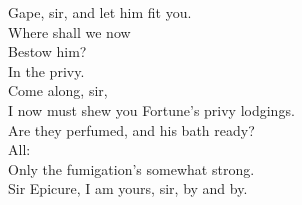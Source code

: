 \documentclass{memoir}
\begin{document}
\begin{drama*}
 Gape, sir, and let him fit you.\\
\subtlespeaks {} Where shall we now\\
 Bestow him?\\
\dolspeaks {} In the privy.\\
\subtlespeaks {} Come along, sir,\\
 I now must shew you Fortune's privy lodgings.\\
\facespeaks  Are they perfumed, and his bath ready?\\
\subtlespeaks {} All:\\
 Only the fumigation's somewhat strong.\\
\facespeaks {}
 Sir Epicure, I am yours, sir, by and by.\\
\act

\scene


\end{drama*}
\end{document}
